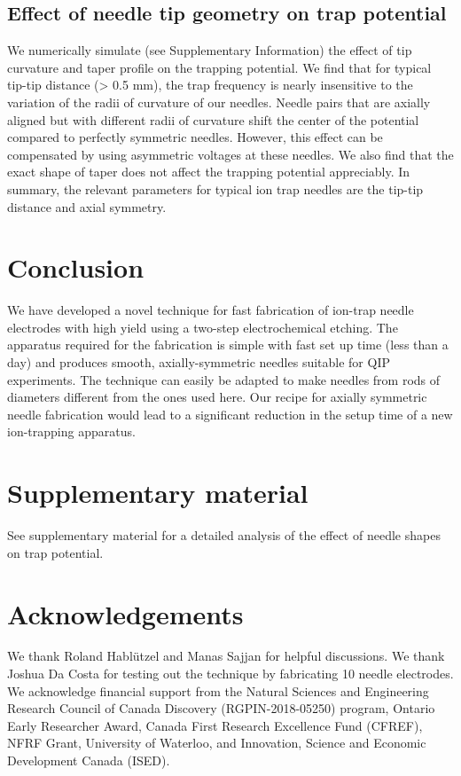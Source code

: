 \documentclass[%
 aip,
 amsmath,amssymb,
 reprint,%
]{revtex4-1}
\begin{document}
\subsection{Effect of needle tip geometry on trap potential}
We numerically simulate (see Supplementary Information) the effect of tip curvature and taper profile on the trapping potential.
We find that for typical tip-tip distance (> 0.5 mm), the trap frequency is nearly insensitive to the variation of the radii of curvature of our needles.
Needle pairs that are axially aligned but with different radii of curvature shift the center of the potential compared to perfectly symmetric needles. 
However, this effect can be compensated by using asymmetric voltages at these needles.
We also find that the exact shape of taper does not affect the
trapping potential appreciably.
In summary, the relevant parameters for typical ion trap needles are the tip-tip distance and axial symmetry.

\section{Conclusion}
We have developed a novel technique for fast fabrication of ion-trap needle electrodes with high yield using a two-step electrochemical etching. 
The apparatus required for the fabrication is simple with fast set up time (less than a day) and produces smooth, axially-symmetric needles suitable for QIP experiments. 
The technique can easily be adapted to make needles from rods of diameters different from the ones used here. 
Our recipe for axially symmetric needle fabrication would lead to a significant reduction in the setup time of a new ion-trapping apparatus.

\section*{Supplementary material}
See supplementary material for a detailed analysis of the effect of needle shapes on trap potential.
\section*{Acknowledgements}
We thank Roland Hablützel and Manas Sajjan for helpful discussions. We thank Joshua Da Costa for testing out the technique by fabricating 10 needle electrodes.
We acknowledge financial support from the Natural Sciences and Engineering Research Council of Canada Discovery (RGPIN-2018-05250) program, Ontario Early Researcher Award, Canada First Research Excellence Fund (CFREF), NFRF Grant, University of Waterloo, and Innovation, Science and Economic Development Canada (ISED).



\nocite{*}
\end{document}
